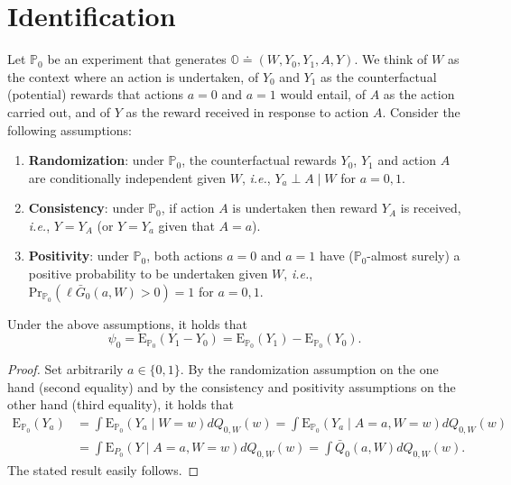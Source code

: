 \documentclass[11pt,openright,twoside]{book}
\newcommand{\bbO}{\mathbb{O}}
\newcommand{\bbP}{\mathbb{P}}
\newcommand{\defq}{\doteq}
\newcommand{\Exp}{\textrm{E}}
\newcommand{\Gbar}{\bar{G}}
\renewcommand{\Pr}{\textrm{Pr}}
\newcommand{\Qbar}{\bar{Q}}
\theoremstyle{definition}
\theoremstyle{definition}
\theoremstyle{definition}
\theoremstyle{remark}
\let\BeginKnitrBlock\begin \let\EndKnitrBlock\end
\begin{document}
\hypertarget{identification}{%
\section{Identification}\label{identification}}

Let \(\bbP_{0}\) be an experiment that generates \(\bbO \defq (W, Y_{0}, Y_{1}, A, Y)\). We think of \(W\) as the context where an action is undertaken, of
\(Y_{0}\) and \(Y_{1}\) as the counterfactual (potential) rewards that actions
\(a=0\) and \(a=1\) would entail, of \(A\) as the action carried out, and of \(Y\) as
the reward received in response to action \(A\). Consider the following
assumptions:

\begin{enumerate}
\def\labelenumi{\arabic{enumi}.}
\item
  \textbf{Randomization}: under \(\bbP_{0}\), the counterfactual rewards
  \(Y_0\), \(Y_1\) and action \(A\) are conditionally independent given \(W\), \emph{i.e.},
  \(Y_a \perp A \mid W\) for \(a=0,1\).
\item
  \textbf{Consistency}: under \(\bbP_{0}\), if action \(A\) is undertaken then reward
  \(Y_{A}\) is received, \emph{i.e.}, \(Y = Y_{A}\) (or \(Y=Y_{a}\) given that \(A=a\)).
\item
  \textbf{Positivity}: under \(\bbP_{0}\), both actions \(a=0\) and \(a=1\) have
  (\(\bbP_{0}\)-almost surely) a positive probability to be undertaken given
  \(W\), \emph{i.e.}, \(\Pr_{\bbP_0}(\ell\Gbar_0(a,W) > 0) = 1\) for \(a=0,1\).
\end{enumerate}

\BeginKnitrBlock{proposition}[Identification]
\protect\hypertarget{prp:unnamed-chunk-2}{}{\label{prp:unnamed-chunk-2} {} }Under the above assumptions, it holds that \begin{equation*}  \psi_{0}  =
\Exp_{\bbP_{0}}   \left(Y_{1}   -   Y_{0}\right)  =   \Exp_{\bbP_{0}}(Y_1)   -
\Exp_{\bbP_{0}}(Y_0). \end{equation*}
\EndKnitrBlock{proposition}

\BeginKnitrBlock{proof}
{}Set arbitrarily \(a \in \{0,1\}\). By the randomization assumption on the one
hand (second equality) and by the consistency and positivity assumptions on
the other hand (third equality), it holds that \begin{align*}
\Exp_{\bbP_0}(Y_a) &=  \int \Exp_{\bbP_0}(Y_a \mid  W = w) dQ_{0,W}(w)  = \int
\Exp_{\bbP_0}(Y_a \mid A = a, W =  w) dQ_{0,W}(w) \\ &= \int \Exp_{P_0}(Y \mid
A =  a, W = w)  dQ_{0,W}(w) = \int \Qbar_0(a,W)  dQ_{0,W}(w). \end{align*} The
stated result easily follows.
\EndKnitrBlock{proof}
\end{document}
